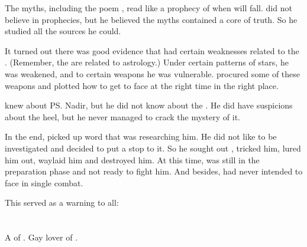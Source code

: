 The myths, including the poem \emph{}, read like a prophecy of when \Ishnaruchaefir{} will fall. 
\Lothagiel{} did not believe in prophecies, but he believed the myths contained a core of truth. 
So he studied all the sources he could. 

It turned out there was good evidence that \Ishnaruchaefir{} had certain  weaknesses related to the . 
(Remember, the \matrices{} are related to astrology.) 
Under certain patterns of stars, he was weakened, and to certain weapons he was vulnerable. 
\Lothagiel{} procured some of these weapons and plotted how to get to face \Ishnaruchaefir{} at the right time in the right place. 

\Lothagiel{} knew about \ps{\Ishnaruchaefir} Nadir, but he did not know about the . 
He did have suspicions about the heel, but he never managed to crack the mystery of it. 

In the end, \Ishnaruchaefir{} picked up word that \Lothagiel{} was researching him. 
He did not like to be investigated and decided to put a stop to it. 
So he sought out \Lothagiel, tricked him, lured him out, waylaid him and destroyed him. 
At this time, \Lothagiel{} was still in the preparation phase and not ready to fight him. 
And besides, \Lothagiel{} had never intended to face \Ishnaruchaefir{} in single combat. 

This served as a warning to all: 















\section{\Nemuragh}
\index{\Nemuragh}
A \thelyad{} \resphan{} of \TiphredSerah. 
Gay lover of \Lothagiel. 















